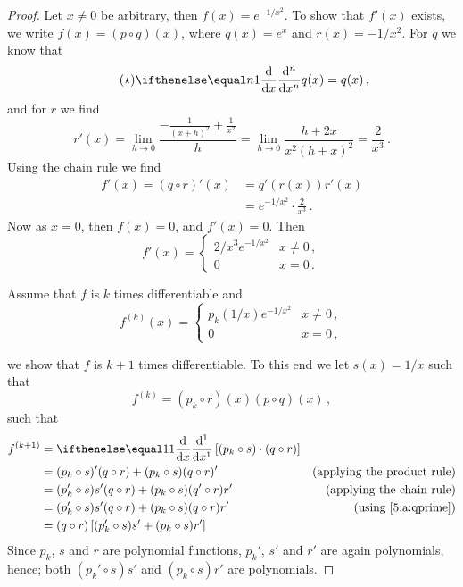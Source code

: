 \documentclass[week=6]{homework}
\begin{document}
\begin{questions}
\begin{parts}
\begin{proof}
	    		Let $x \neq 0$ be arbitrary, then $f(x) = e^{-1/x^2}$. To show that $f'(x)$ exists, we write $f(x) = (p\circ q)(x)$, where $q(x) = e^x$ and $r(x) = -1/x^2$.
	    		For $q$ we know that 
	    		\begin{equation} \label{5:a:qprime} \tag{$\star$}
		    		\diff[x][n]{}q(x) = q(x)\,,
	    		\end{equation}
	    		and for $r$ we find
	    		\[
		    		r'(x) = \lim_{h\to 0} \frac{-\frac{1}{(x+h)^2} + \frac{1}{x^2}}{h} = \lim_{h\to 0} \frac{h+2x}{x^2 (h+x)^2} = \frac{2}{x^3}\,.
	    		\]
	    		Using the chain rule we find
	    		\begin{align*}
	    			f'(x) = (q \circ r)'(x) &= q'(r(x))r'(x) \\
		    			&= e^{-1/x^2}\cdot\frac{2}{x^3}\,.
	    		\end{align*}
	    		Now as $x=0$, then $f(x) = 0$, and $f'(x) = 0$. Then
	    		\[
		    		f'(x) = \begin{cases} 2/x^3e^{-1/x^2} & x\neq 0\,, \\ 0 & x = 0\,. \end{cases}
	    		\]
	    		
	    		Assume that $f$ is $k$ times differentiable and
	    		\[
		    		f^{(k)}(x) = \begin{cases} p_k(1/x)e^{-1/x^2} & x\neq 0\,, \\ 0 & x = 0\,, \end{cases}
	    		\]
	    		
	    		we show that $f$ is $k+1$ times differentiable. To this end we let $s(x) = 1/x$ such that
	    		\[
		    		f^{(k)} = (p_k \circ r)(x)(p\circ q)(x)\,,
		    	\]
		    	such that
		    	\begin{align*}
		    		f^{(k+1)} &= \diff{} \left[(p_k \circ s)\cdot(q\circ r)\right] \\
		    		&= (p_k \circ s)'(q\circ r) + (p_k \circ s)(q\circ r)' & \mbox{(applying the product rule)} \\
		    		&= (p_k' \circ s)s' (q\circ r) + (p_k \circ s)(q' \circ r)r' & \mbox{(applying the chain rule)} \\
		    		&= (p_k' \circ s)s' (q\circ r) + (p_k \circ s)(q\circ r)r' & \mbox{(using \ref{5:a:qprime})} \\
		    		&= (q\circ r)\left[ (p_k' \circ s)s'  + (p_k \circ s)r' \right]\\
		    	\end{align*}
		    	Since $p_k$, $s$ and $r$ are polynomial functions, $p_k'$, $s'$ and $r'$ are again polynomials, hence; both $(p_k' \circ s)s'$ and $(p_k \circ s)r'$ are polynomials.
		    	

\end{proof}
\end{parts}
\end{questions}
\end{document}
